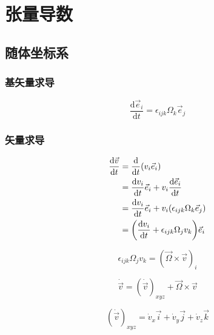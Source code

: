 \chapter{张量导数}

\section{随体坐标系}
\subsection{基矢量求导}
\begin{equation}
    \frac{\mathrm{d} \vec{e}_i}{\mathrm{d}t}=\epsilon_{ijk}\Omega_k\vec{e}_j
\end{equation}
\subsection{矢量求导}
\begin{equation}
    \begin{split}
        \frac{\mathrm{d} \vec{v}}{\mathrm{d}t}&=\frac{\mathrm{d}}{\mathrm{d}t}(v_i\vec{e}_i)\\
        &=\frac{\mathrm{d}v_i}{\mathrm{d}t}\vec{e}_i+v_i\frac{\mathrm{d}\vec{e}_i}{\mathrm{d}t}\\
        &=\frac{\mathrm{d}v_i}{\mathrm{d}t}\vec{e}_i+v_i(\epsilon_{ijk}\Omega_k\vec{e}_j)\\
        &=\qty(\frac{\mathrm{d}v_i}{\mathrm{d}t}+\epsilon_{ijk}\Omega_jv_k)\vec{e}_i
    \end{split}
\end{equation}

\begin{equation}
    \epsilon_{ijk}\Omega_jv_k=(\vec{\Omega}\times\vec{v})_{i}
\end{equation}

\begin{equation}
    \dot{\vec{v}}=(\dot{\vec{v}})_{xyz}+\vec{\Omega}\times\vec{v}
\end{equation}

\begin{equation}
    (\dot{\vec{v}})_{xyz}=\dot{v}_x\vec{i}+\dot{v}_y\vec{j}+\dot{v}_z\vec{k}
\end{equation}


